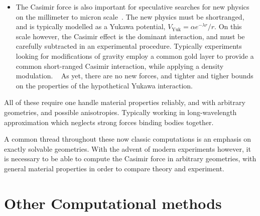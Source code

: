 \begin{itemize}
\item The Casimir force is also important for speculative searches for new physics on the millimeter to micron
scale~\cite{Gervaci}.  The new physics must be shortranged, and is typically modelled as 
a Yukawa potential, $V_{\text{Yuk}}=\alpha e^{-\lambda r}/r$.  
On this scale however, the Casimir effect is the dominant interaction, and must be 
carefully subtracted in an experimental procedure.  Typically experiments looking for modifications
of gravity employ a common gold layer to provide a common short-ranged Casimir interaction, while
applying a density modulation.  ~\cite{Tino, Gervaci}
As yet, there are no new forces, and tighter and tigher bounds on the properties of the hypothetical
Yukawa interaction.  

\end{itemize}
All of these require one handle material properties reliably, and with arbitrary geometries,
and possible anisotropies.  Typically working in long-wavelength approximation which neglects strong
forces binding bodies together.    

A common thread throughout these now classic computations is an emphasis on exactly solvable
geometries.  With the advent of modern experiments however, it is necessary to be able 
to compute the Casimir force in arbitrary geometries, with general material properties in order
to compare theory and experiment.  






\section{Other Computational methods}

